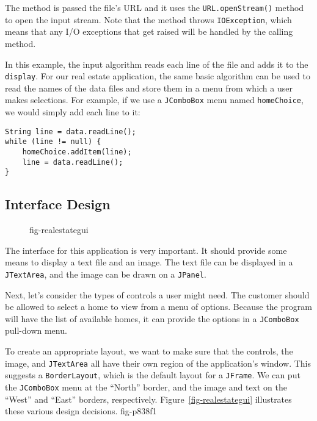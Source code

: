 \noindent The method is passed the file's URL and it uses the
{\tt URL.openStream()} method to open the input stream.  Note
that the method throws \mbox{\tt IOException}, which means that
any I/O exceptions that get raised will be handled by the calling
method.

In this example, the input algorithm reads each line of the file and
adds it to the {\tt display}.  For our real estate application, the
same basic algorithm can be used to read the names of the data files
and store them in a menu from which a user makes selections.  For
example, if we use a {\tt JComboBox} menu named {\tt homeChoice}, we
would simply add each line to it:

\begin{jjjlisting}
\begin{lstlisting}
String line = data.readLine();
while (line != null) {
    homeChoice.addItem(line);
    line = data.readLine();
}
\end{lstlisting}
\end{jjjlisting}

\subsection*{Interface Design}

\begin{figure}[tb]
 {fig-realestategui}
\end{figure}

\noindent The interface for this application is very important.  It
should provide some means to display a text file and an image.  The
text file can be displayed in a {\tt JTextArea}, and the image  can
be drawn on a {\tt JPanel}.

Next, let's consider the types of controls a user might need. The
customer should be allowed to select a home to view from a menu of
options.  Because the program will have the list of available homes,
it can provide the options in a {\tt JComboBox} pull-down menu.

To create an appropriate layout, we want to make sure that the
controls, the image, and {\tt JTextArea} all have their own region of
the application's window.  This suggests a {\tt BorderLayout}, which is
the default layout for a {\tt JFrame}.  We can put the {\tt JComboBox}
menu at the ``North'' border, and the image and text on the ``West''
and ``East'' borders, respectively.  Figure~\ref{fig-realestategui}
illustrates these various design decisions.
{fig-p838f1}


